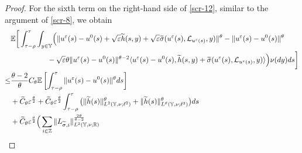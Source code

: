 \documentclass[11pt]{article}
\numberwithin{equation}{section}
\theoremstyle{plain}
\begin{document}
\begin{proof}
 For the sixth term on the right-hand side of \eqref{scr-12},
 similar to the argument of \eqref{scr-8}, we obtain 
 \begin{align}\label{scr-17}  
       & \mathbb{E}
                    \bigg[ \int_{\tau-\rho}^{\tau} 
                                 \int_{y \in \mathbb{Y} } 
                                     \Bigl( \| u^{\varepsilon}(s) - u^0(s)
	                                              + \sqrt{\varepsilon}\widetilde{h}(s, y) 
	                                              + \sqrt{\varepsilon}
	                                                        \widetilde{\sigma}
	                                                              (u^{\varepsilon}(s), \mathcal{L}_{u^{\varepsilon}(s)}, y)
	                                           \|^{\theta}
      	                                       - \| u^{\varepsilon}(s) - u^0(s) \|^{\theta}  \nonumber\\
	  & \qquad\qquad\quad
	                                           - \sqrt{ \varepsilon} \theta 
	                                                                             \| u^{\varepsilon}(s) - u^0(s) \|^{\theta - 2}
	                                           \langle u^{\varepsilon}(s) - u^0(s),
	                                                        \widetilde{h}(s,y) 
	                                                        + \widetilde{\sigma}
	                                                               (u^{\varepsilon}(s), \mathcal{L}_{u^{\varepsilon}(s)}, y)
	                                           \rangle
	                                 \Bigr) \nu(dy) ds   
	                  \bigg] \nonumber\\ 
 \le & \frac{\theta-2}{\theta} C_{\theta}
 	         \mathbb{E}
 	              \left[ \int_{\tau-\rho}^{\tau}
                               \| u^{\varepsilon}(s) - u^0(s) \|^{\theta} ds
                  \right]  \nonumber\\ 
      & + \widetilde{C}_\theta \varepsilon^{\frac{\theta}{2} }
          + \widetilde{C}_\theta \varepsilon^{\frac{\theta}{2} }  
                    \int_{\tau-\rho}^{\tau}
           	                \big( \| \widetilde{h}(s) \|_{L^2(\mathbb{Y}, \nu; \ell^2) }^\theta
           	                         + \| \widetilde{h}(s) \|^{\theta}_{L^{\theta}(\mathbb{Y}, \nu; \ell^2) }
           	                \big)  
           	        ds  \nonumber\\
      &  + \widetilde{C}_\theta \varepsilon^{\frac{\theta}{2} } 
                   \Big( \sum_{i \in \mathbb{Z} } 
                                           \| L_{ \widetilde{\sigma}, i} \|_{L^2(\mathbb{Y}, \nu; \mathbb{R} ) }^{\frac{2\theta}{\theta -2} } 

\end{align}
\end{proof}
\end{document}
